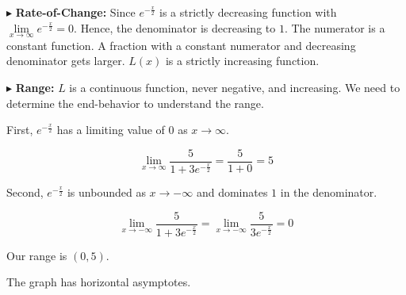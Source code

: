 \documentclass{ximera}
\begin{document}
$\blacktriangleright$ \textbf{Rate-of-Change:}    Since $e^{-\tfrac{x}{2}}$ is a strictly decreasing function with $\lim\limits_{x \to \infty}e^{-\tfrac{x}{2}}=0$. Hence, the denominator is decreasing to $1$. The numerator is a constant function. A fraction with a constant numerator and decreasing denominator gets larger. $L(x)$ is a strictly increasing function.






$\blacktriangleright$ \textbf{Range:} $L$ is a continuous function, never negative, and increasing. We need to determine the end-behavior to understand the range.


First, $e^{-\tfrac{x}{2}}$ has a limiting value of $0$ as $x \to \infty$.


\[   \lim_{x \to \infty} \frac{5}{1+3 e^{-\tfrac{x}{2}}} =   \frac{5}{1 + 0}   = 5 \]



Second, $e^{-\tfrac{x}{2}}$ is unbounded as $x \to -\infty$ and dominates $1$ in the denominator.

\[   \lim_{x \to -\infty} \frac{5}{1+3 e^{-\tfrac{x}{2}}} =   \lim_{x \to -\infty} \frac{5}{3 e^{-\tfrac{x}{2}}}   = 0 \]



Our range is $(0, 5)$.


The graph has horizontal asymptotes.
\end{document}
